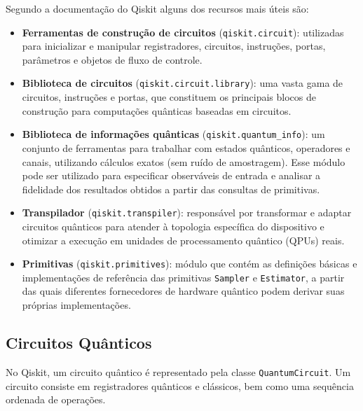 Segundo a documentação do Qiskit \cite{ibm_quantum_tools_intro} alguns dos recursos mais úteis são:

\begin{itemize}
    \item \textbf{Ferramentas de construção de circuitos} (\texttt{qiskit.circuit}): 
    utilizadas para inicializar e manipular registradores, circuitos, instruções, portas, parâmetros e objetos de fluxo de controle.

    \item \textbf{Biblioteca de circuitos} (\texttt{qiskit.circuit.library}):
    uma vasta gama de circuitos, instruções e portas, que constituem os principais blocos de construção para computações quânticas baseadas em circuitos.

    \item \textbf{Biblioteca de informações quânticas} (\texttt{qiskit.quantum\_info}): 
    um conjunto de ferramentas para trabalhar com estados quânticos, operadores e canais, utilizando cálculos exatos (sem ruído de amostragem). 
    Esse módulo pode ser utilizado para especificar observáveis de entrada e analisar a fidelidade dos resultados obtidos a partir das consultas de primitivas.

    \item \textbf{Transpilador} (\texttt{qiskit.transpiler}):
    responsável por transformar e adaptar circuitos quânticos para atender à topologia específica do dispositivo e otimizar a execução em unidades de processamento quântico (QPUs) reais.

    \item \textbf{Primitivas} (\texttt{qiskit.primitives}):
    módulo que contém as definições básicas e implementações de referência das primitivas \texttt{Sampler} e \texttt{Estimator}, 
    a partir das quais diferentes fornecedores de hardware quântico podem derivar suas próprias implementações.
\end{itemize}

\subsection{Circuitos Quânticos}

No Qiskit, um circuito quântico é representado pela classe \texttt{QuantumCircuit}. Um circuito consiste em registradores quânticos e clássicos, bem como uma sequência ordenada de operações.

